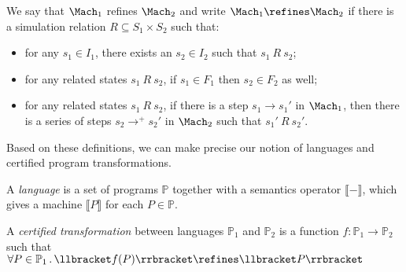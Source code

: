 
\begin{definition}[Refinement]
We say that {\small$\Mach_1$} refines {\small $\Mach_2$}
and write {\small $\Mach_1 \refines \Mach_2$}
if there is a simulation relation {\small $R \subseteq S_1 \times S_2$}
such that:
\begin{itemize}
\item for any $s_1 \in I_1$,
	there exists an $s_2 \in I_2$
	such that $s_1 \ R\ s_2$;
\item for any related states $s_1\ R\ s_2$, %
	if $s_1 \in F_1$ then $s_2 \in F_2$ as well;
\item for any related states $s_1\ R\ s_2$, %
	if there is a step $s_1 \rightarrow s_1'$ in $\Mach_1$,
	then there is a series of steps $s_2 \rightarrow^+ s_2'$ in $\Mach_2$
	such that $s_1'\ R\ s_2'$.
\end{itemize}
\end{definition}

Based on these definitions,
we can make precise our notion of languages and
certified program transformations.

\begin{definition} \label{def:certified-trans}
A \emph{language} is a set of programs $\mathbb{P}$
together with a semantics operator $\llbracket - \rrbracket$,
which gives a machine $\llbracket P \rrbracket$ for each $P \in \mathbb{P}$.

A \emph{certified transformation} between languages $\mathbb{P}_1$ and $\mathbb{P}_2$
is a function $f : \mathbb{P}_1 \rightarrow \mathbb{P}_2$ such that
$\forall P \in \mathbb{P}_1 \,.\,
\llbracket f(P) \rrbracket \refines \llbracket P \rrbracket$
\end{definition}

